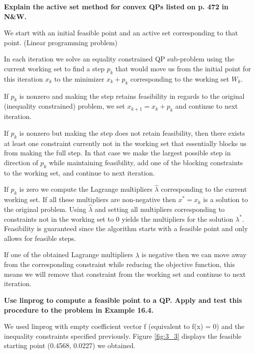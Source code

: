 \textbf{Explain the active set method for convex QPs listed on p. 472 in N\&W.}

We start with an initial feasible point and an active set corresponding to that point. (Linear programming problem)

In each iteration we solve an equality constrained QP sub-problem using the current working set to find a step $p_k$ that would move us from the initial point for this iteration $x_k$ to the minimizer $x_k + p_k$ corresponding to the working set $W_k$. 

If $p_k$ is nonzero and making the step retains feasibility in regards to the original (inequality constrained) problem, we set $x_{k+1} = x_k + p_k$ and continue to next iteration.

If $p_k$ is nonzero but making the step does not retain feasibility, then there exists at least one constraint currently not in the working set that essentially blocks us from making the full step. In that case we make the largest possible step in direction of $p_k$ while maintaining feasibility, add one of the blocking constraints to the working set, and continue to next iteration.

If $p_k$ is zero we compute the Lagrange multipliers $\hat{\lambda}$ corresponding to the current working set. If all these multipliers are non-negative then $x^* = x_k$ is a solution to the original problem. Using $\hat{\lambda}$ and setting all multipliers corresponding to constraints not in the working set to 0 yields the multipliers for the solution $\lambda^*$. Feasibility is guaranteed since the algorithm starts with a feasible point and only allows for feasible steps.

If one of the obtained Lagrange multipliers $\hat{\lambda}$ is negative then we can move away from the corresponding constraint while reducing the objective function, this means we will remove that constraint from the working set and continue to next iteration.


\textbf{Use linprog to compute a feasible point to a QP. Apply and test this procedure to the problem in Example 16.4.}

We used linprog with empty coefficient vector f (equivalent to f(x) = 0) and the inequality constraints specified previously. Figure \ref{fig:3_3} displays the feasible starting point (0.4568, 0.0227) we obtained. 

